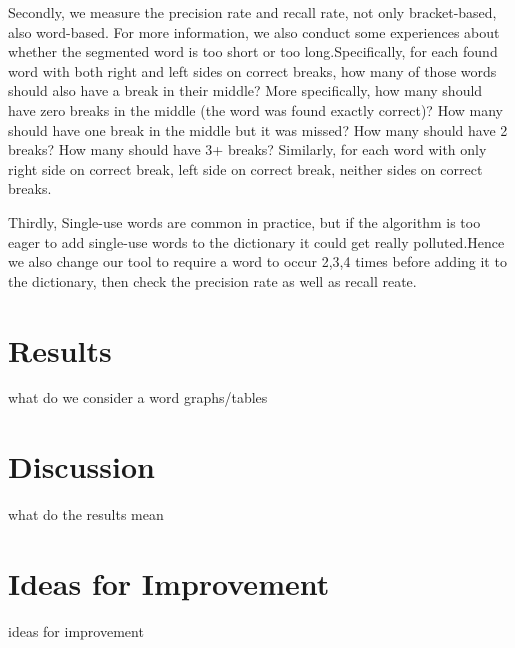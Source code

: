 \documentclass[11pt, oneside, fleqn]{article}
\begin{document}
    Secondly, we measure the precision rate and recall rate, not only bracket-based, also word-based. 
    For more information, we also conduct some experiences about whether the segmented word is too short or too long.Specifically, for each found word with both right and left sides on correct breaks, how many of those words should also have a break in their middle? More specifically, how many should have zero breaks in the middle (the word was found exactly correct)? How many should have one break in the middle but it was missed? How many should have 2 breaks? How many should have 3+ breaks? Similarly, for each word with only right side on correct break, left side on correct break, neither sides on correct breaks. 
   
    Thirdly, Single-use words are common in practice, but if the algorithm is too eager to add single-use words to the dictionary it could get really polluted.Hence we also change our tool to require a word to occur 2,3,4 times before adding it to the dictionary, then check the precision rate as well as recall reate. 
 
   \section*{Results}

  what do we consider a word
  graphs/tables
  
  \section*{Discussion}

  what do the results mean

  \section*{Ideas for Improvement}

  ideas for improvement
\end{document}
